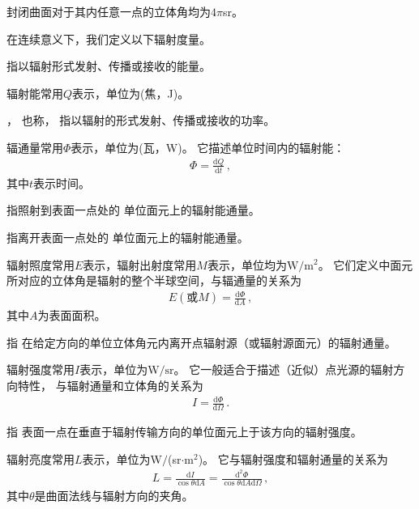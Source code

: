 \begin{corollary}
      封闭曲面对于其内任意一点的立体角均为$4\pi$sr。
\end{corollary}

在连续意义下，我们定义以下辐射度量。

\begin{definition}
      指以辐射形式发射、传播或接收的能量。
\end{definition}
辐射能常用$Q$表示，单位为(焦，J)。

\begin{definition}
      ，
      也称，
      指以辐射的形式发射、传播或接收的功率。
\end{definition}
辐通量常用$\varPhi$表示，单位为(瓦，W)。
它描述单位时间内的辐射能：
\begin{align}
      \varPhi=\frac{\mathrm{d}Q}{\mathrm{d}t}\, ,
\end{align}
其中$t$表示时间。

\begin{definition}
      指照射到表面一点处的
      单位面元上的辐射能通量。
\end{definition}
\begin{definition}
      指离开表面一点处的
      单位面元上的辐射能通量。
\end{definition}
辐射照度常用$E$表示，辐射出射度常用$M$表示，单位均为$\text{W}/\text{m}^2$。
它们定义中面元所对应的立体角是辐射的整个半球空间，与辐通量的关系为
\begin{align}
      E(\text{或}M)=\frac{\mathrm{d}\varPhi}{\mathrm{d}A}\, ,
\end{align}
其中$A$为表面面积。

\begin{definition}
      指
      在给定方向的单位立体角元内离开点辐射源（或辐射源面元）的辐射通量。
\end{definition}
辐射强度常用$I$表示，单位为$\text{W}/\text{sr}$。
它一般适合于描述（近似）点光源的辐射方向特性，
与辐射通量和立体角的关系为
\begin{align}
      I=\frac{\mathrm{d}\varPhi}{\mathrm{d}\varOmega}\, .
\end{align}

\begin{definition}
      指
      表面一点在垂直于辐射传输方向的单位面元上于该方向的辐射强度。
\end{definition}
辐射亮度常用$L$表示，单位为W$/$(sr$\cdot$m$^2$)。
它与辐射强度和辐射通量的关系为
\begin{align}
      L=\frac{\mathrm{d}I}{\cos\theta\mathrm{d}A}=\frac{\mathrm{d}^2\varPhi}{\cos\theta\mathrm{d}A\mathrm{d}\varOmega}\, ,
\end{align}
其中$\theta$是曲面法线与辐射方向的夹角。


